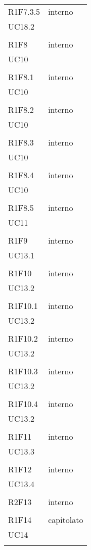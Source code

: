 \begin{longtable}{ >{\centering}p{}
		>{\centering}p{}}
	R1F7.3.5 & interno\\UC18.2\\\tabularnewline
	
	R1F8 & interno\\UC10\\\tabularnewline
	
	R1F8.1 & interno\\UC10\\\tabularnewline
	
	R1F8.2 & interno\\UC10\\\tabularnewline
	
	R1F8.3 & interno\\UC10\\\tabularnewline
	
	R1F8.4 & interno\\UC10\\\tabularnewline
	
	R1F8.5 & interno\\UC11\\\tabularnewline
	
	R1F9 & interno\\UC13.1\\\tabularnewline
	
	R1F10 & interno\\UC13.2\\\tabularnewline
	
	R1F10.1 & interno\\UC13.2\\\tabularnewline
	
	R1F10.2 & interno\\UC13.2\\\tabularnewline
	
	R1F10.3 & interno\\UC13.2\\\tabularnewline
	
	R1F10.4 & interno\\UC13.2\\\tabularnewline
	
	R1F11 & interno\\UC13.3\\\tabularnewline
	
	R1F12 & interno\\UC13.4\\\tabularnewline
	
	R2F13 & interno\\\tabularnewline
	
	R1F14 & capitolato\\UC14\\\tabularnewline
	

\end{longtable}
